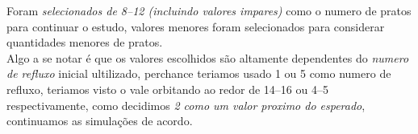 \documentclass[\mainfilename]{subfiles}
\begin{document}
\begin{sectionBox}
    Foram \emph{selecionados de \numrange*{8}{12} (incluindo valores impares)} como o numero de pratos para continuar o estudo, valores menores foram selecionados para considerar quantidades menores de pratos.\\

    Algo a se notar é que os valores escolhidos são altamente dependentes do \emph{numero de refluxo} inicial ultilizado, perchance teriamos usado 1 ou 5 como numero de refluxo, teriamos visto o vale orbitando ao redor de \numrange*{14}{16} ou \numrange*{4}{5} respectivamente, como decidimos \emph{2 como um valor proximo do esperado}, continuamos as simulações de acordo.
    
\end{sectionBox}
\end{document}
